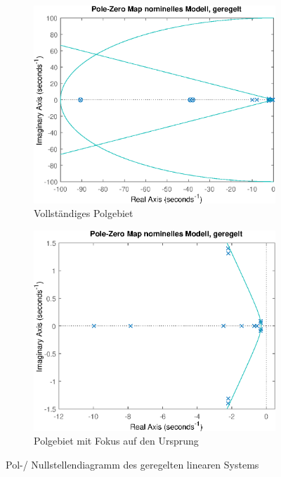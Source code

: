 \begin{figure}[h] %
	\centering
	\begin{subfigure}{.49\textwidth}
		\centering
		\includegraphics[width=\linewidth]{./Bilder/pzmap_controlled.eps}
		\caption{Vollständiges Polgebiet}
		\label{fig:pzmap_controlled_ohnezoom}
	\end{subfigure}
	\hfill
	\begin{subfigure}{.49\textwidth}
		\centering
		\includegraphics[width=\linewidth]{./Bilder/pzmap_controlled_zoom.eps}
		\caption{Polgebiet mit Fokus auf den Ursprung}
		\label{fig:pzmap_controlled_zoom}
	\end{subfigure}
	\caption{Pol-/ Nullstellendiagramm des geregelten linearen Systems}
	\label{fig:pzmap_controlled}
\end{figure}

